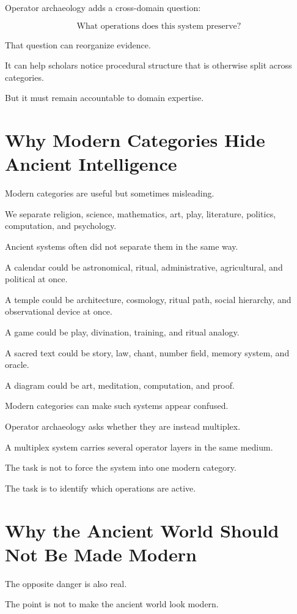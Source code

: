 \documentclass[11pt]{book}
\begin{document}
Operator archaeology adds a cross-domain question:

\[
\text{What operations does this system preserve?}
\]

That question can reorganize evidence.

It can help scholars notice procedural structure that is otherwise split across categories.

But it must remain accountable to domain expertise.

\section{Why Modern Categories Hide Ancient Intelligence}

Modern categories are useful but sometimes misleading.

We separate religion, science, mathematics, art, play, literature, politics, computation, and psychology.

Ancient systems often did not separate them in the same way.

A calendar could be astronomical, ritual, administrative, agricultural, and political at once.

A temple could be architecture, cosmology, ritual path, social hierarchy, and observational device at once.

A game could be play, divination, training, and ritual analogy.

A sacred text could be story, law, chant, number field, memory system, and oracle.

A diagram could be art, meditation, computation, and proof.

Modern categories can make such systems appear confused.

Operator archaeology asks whether they are instead multiplex.

A multiplex system carries several operator layers in the same medium.

The task is not to force the system into one modern category.

The task is to identify which operations are active.

\section{Why the Ancient World Should Not Be Made Modern}

The opposite danger is also real.

The point is not to make the ancient world look modern.
\end{document}
